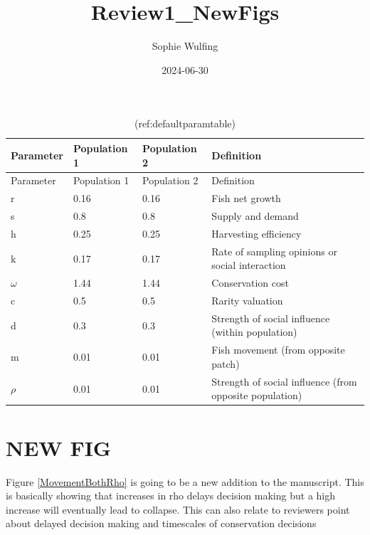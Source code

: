\documentclass[
]{article}
\title{Review1\_NewFigs}
\author{Sophie Wulfing}
\date{2024-06-30}
\begin{document}
\maketitle

\begin{longtable}[]{@{}llll@{}}
\caption{\label{tab:DefaultParamTable}(ref:defaultparamtable) \label{DefaultParamTable}}\tabularnewline
\toprule\noalign{}
Parameter & Population 1 & Population 2 & Definition \\
\midrule\noalign{}
\endfirsthead
\toprule\noalign{}
Parameter & Population 1 & Population 2 & Definition \\
\midrule\noalign{}
\endhead
\bottomrule\noalign{}
\endlastfoot
r & 0.16 & 0.16 & Fish net growth \\
s & 0.8 & 0.8 & Supply and demand \\
h & 0.25 & 0.25 & Harvesting efficiency \\
k & 0.17 & 0.17 & Rate of sampling opinions or social interaction \\
\(\omega\) & 1.44 & 1.44 & Conservation cost \\
c & 0.5 & 0.5 & Rarity valuation \\
d & 0.3 & 0.3 & Strength of social influence (within population) \\
m & 0.01 & 0.01 & Fish movement (from opposite patch) \\
\(\rho\) & 0.01 & 0.01 & Strength of social influence (from opposite population) \\
\end{longtable}

\section{NEW FIG}\label{new-fig}

Figure \ref{MovementBothRho} is going to be a new addition to the manuscript. This is basically showing that increases in rho delays decision making but a high increase will eventually lead to collapse. This can also relate to reviewers point about delayed decision making and timescales of conservation decisions
\end{document}
